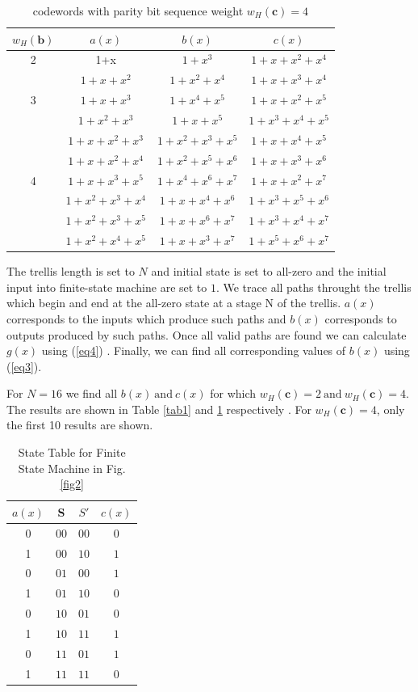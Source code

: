 \documentclass[conference]{IEEEtran}
\begin{document}
		
		\begin{table}[h!]
 
 \caption{codewords with parity bit sequence weight $w_H(\textbf{c})=4$}
\centering
 \begin{tabular}{c c c c} 
 \hline
 $w_H(\textbf{b})$ & $a(x)$ & $b(x)$ & $c(x)$ \\ [0.5ex] 
 \hline\hline
 2 & 1+x & $1+x^3$ & $1+x+x^2+x^4$\\ 
 \hline 
  & $1+x+x^2$& $1+x^2+x^4$& $1+x+x^3+x^4$ \\
   3 & $1+x+x^3$& $1+x^4+x^5$ & $1+x+x^2+x^5$ \\
  & $1+x^2+x^3$ & $1+x+x^5$ & $1+x^3+x^4+x^5$ \\
  \hline 
  & $1+x+x^2+x^3 $ & $1+x^2+x^3+x^5$ & $1+x+x^4+x^5$ \\
  & $1+x+x^2+x^4 $ & $1+x^2+x^5+x^6$ & $1+x+x^3+x^6$ \\
 4 & $1+x+x^3+x^5 $ & $1+x^4+x^6+x^7$ & $1+x+x^2+x^7$\\ 
  & $1+x^2+x^3+x^4 $ & $1+x+x^4+x^6$ & $1+x^{3}+x^5+x^6$ \\ 
  & $1+x^2+x^3+x^5 $ & $1+x+x^6+x^7$ & $1+x^{3}+x^4+x^7$ \\  
  & $1+x^2+x^4+x^5 $ & $1+x+x^3+x^7$ & $1+x^5+x^6+x^7$ \\ 
 [1ex]
 \hline
 \end{tabular}
 \label{tab2}
\end{table}
		The trellis length is set to $N$ and initial state is set to all-zero and the initial input into finite-state machine are set to $1$.  We trace all paths throught the trellis which begin and end at the all-zero state at a stage N of the trellis. $a(x)$ corresponds to the inputs which produce such paths and $b(x)$ corresponds to outputs produced by such paths. Once all valid paths are found we can calculate $g(x)$ using (\ref{eq4}) . Finally, we can find all corresponding values of $b(x)$ using (\ref{eq3}).
 
 For $N=16$ we find all $b(x) ~\text{and}~ c(x)$ for which $w_H(\textbf{c})=2 ~\text{and} ~ w_H(\textbf{c})=4$. The results are shown in Table \ref{tab1} and \ref{tab2} respectively . For $w_H(\textbf{c})=4$, only the first 10 results are shown.  
 
   \begin{table}[h!]
 
 \caption{State Table for Finite State Machine in Fig. \ref{fig2}}
\centering
 \begin{tabular}{c c c c} 
 \hline
 $a(x)$ & S & $S'$ & $c(x)$ \\ [0.5ex] 
 \hline\hline
 0 & $0 0 $& $0 0$ & $0$\\ 
  1& $0 0$ & $1 0$ & $1$ \\
  0 & $0 1$& $0 0$ & $1$ \\
  1& $0 1$& $1 0$& $0$ \\
  0& $1 0$ & $0 1$ & $0$ \\
 1 & $1 0 $ & $1 1$ & $1$\\ 
 0 & $1 1$ & $0 1$ & $1$ \\ 
 1 & $1 1$ & $1 1$ & $0$ \\ [1ex] 
 \hline
 \end{tabular}
 \label{tab3}
\end{table}
 
\end{document}
